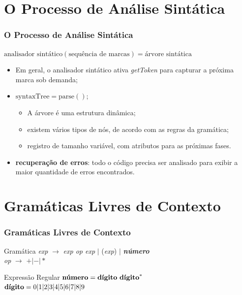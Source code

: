\documentclass[table]{beamer}
\begin{document}
\section{O Processo de Análise Sintática}
\begin{frame}
   \frametitle{O Processo de Análise Sintática}
   \begin{center}
      $\text{analisador sintático}(\text{sequência de marcas}) = \text{árvore sintática}$
   \end{center}
   \begin{itemize}
      \item Em geral, o analisador sintático ativa \textit{getToken} para capturar a próxima marca sob demanda;
      \item $\text{syntaxTree} = \text{parse}()$;
      \begin{itemize}
         \item A árvore é uma estrutura dinâmica;
	 \item existem vários tipos de nós, de acordo com as regras da gramática;
	 \item registro de tamanho variável, com atributos para as próximas fases.
      \end{itemize}
      \item \textbf{recuperação de erros}: todo o código precisa ser analisado para exibir a maior quantidade de erros encontrados.
   \end{itemize}
\end{frame}

\section{Gramáticas Livres de Contexto}
\begin{frame}[fragile]
   \frametitle{Gramáticas Livres de Contexto}
   \begin{block}{Gramática}
   \textit{exp} $\to$ \textit{exp op exp} $|$ (\textit{exp}) $|$ \textbf{\textit{número}} \\
   \textit{op} $\to$ $+|-|*$ \\
   \end{block}
   \begin{block}{Expressão Regular}
   $\text{\textbf{número}} = \text{\textbf{dígito} } \text{\textbf{dígito}}^{*}$ \\
   $\text{\textbf{dígito}} = 0|1|2|3|4|5|6|7|8|9$
   \end{block}
\end{frame}
\end{document}
